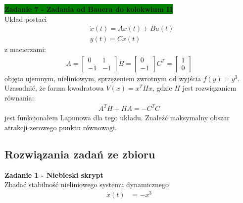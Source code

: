 \documentclass[a4paper,11pt]{article}
\begin{document}
\begin{framed}
\textbf{\colorbox{green}{Zadanie 7 - Zadania od Bauera do kolokwium II }} \\ 
Układ postaci
\begin{align*}
&\dot{x}(t)=Ax(t)+Bu(t) \\
&y(t)=Cx(t) 
\end{align*}
z macierzami:
\begin{align*}
A =
\begin{bmatrix}
0 & 1 \\
-1 & -1 
\end{bmatrix}
B =
\begin{bmatrix}
0  \\
-1  
\end{bmatrix}
C^{T} =
\begin{bmatrix}
1  \\
0 
\end{bmatrix}
\end{align*}
objęto ujemnym, nieliniowym, sprzężeniem zwrotnym od wyjścia \( f(y)=y^{3} \). Uzasadnić, że forma kwadratowa \( V(x)=x^{T}Hx \), gdzie \( H \) jest rozwiązaniem równania: 
\begin{align*}
A^{T}H+HA=-C^{T}C
\end{align*} 
jest funkcjonałem Lapunowa dla tego układu. Znaleźć maksymalny obszar atrakcji zerowego punktu równowagi.
\end{framed}

\newpage
\subsection{Rozwiązania zadań ze zbioru}

\begin{framed}
\textbf{Zadanie 1 - Niebieski skrypt } \\ 
Zbadać stabilność nieliniowego systemu dynamicznego
\begin{align*}
\dot{x}(t)&=-x^{3} \\
\end{align*}
\end{framed}
\end{document}
